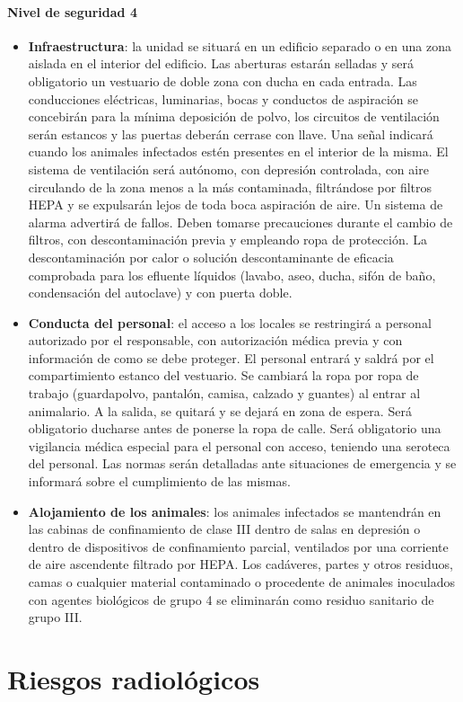\paragraph{Nivel de seguridad 4}
\begin{itemize}[itemsep=0pt,parsep=0pt,topsep=0pt,partopsep=0pt]
    \item \textbf{Infraestructura}: la unidad se situará en un edificio separado o en una zona aislada en el interior del edificio. Las aberturas estarán selladas y será obligatorio un vestuario de doble zona con ducha en cada entrada. Las conducciones eléctricas, luminarias, bocas y conductos de aspiración se concebirán para la mínima deposición de polvo, los circuitos de ventilación serán estancos y las puertas deberán cerrase con llave. Una señal indicará cuando los animales infectados estén presentes en el interior de la misma.  El sistema de ventilación será autónomo, con depresión controlada, con aire circulando de la zona menos a la más contaminada, filtrándose por filtros HEPA y se expulsarán lejos de toda boca aspiración de aire. Un sistema de alarma advertirá de fallos. Deben tomarse precauciones durante el cambio de filtros, con descontaminación previa y empleando ropa de protección. La descontaminación por calor o solución descontaminante de eficacia comprobada para los efluente líquidos (lavabo, aseo, ducha, sifón de baño, condensación del autoclave) y con puerta doble.
    \item \textbf{Conducta del personal}: el acceso a los locales se restringirá a personal autorizado por el responsable, con autorización médica previa y con información de como se debe proteger. El personal entrará y saldrá por el compartimiento estanco del vestuario. Se cambiará la ropa por ropa de trabajo (guardapolvo, pantalón, camisa, calzado y guantes) al entrar al animalario. A la salida, se quitará y se dejará en zona de espera. Será obligatorio ducharse antes de ponerse la ropa de calle. Será obligatorio una vigilancia médica especial para el personal con acceso, teniendo una seroteca del personal. Las normas serán detalladas ante situaciones de emergencia y se informará sobre el cumplimiento de las mismas.
    \item \textbf{Alojamiento de los animales}: los animales infectados se mantendrán en las cabinas de confinamiento de clase III dentro de salas en depresión o dentro de dispositivos de confinamiento parcial, ventilados por una corriente de aire ascendente filtrado por HEPA. Los cadáveres, partes y otros residuos, camas o cualquier material contaminado o procedente de animales inoculados con agentes biológicos de grupo 4 se eliminarán como residuo sanitario de grupo III.
\end{itemize}
\section{Riesgos radiológicos}







